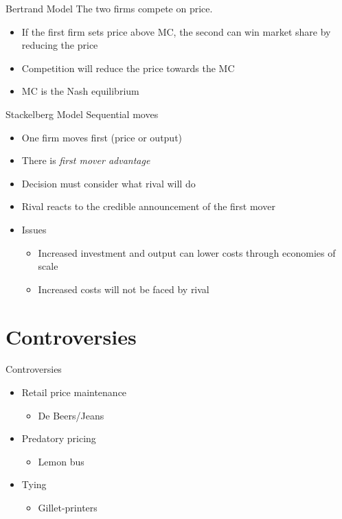 \documentclass[14pt,xcolor=pdftex,dvipsnames,table]{beamer}\usepackage[]{graphicx}\usepackage[]{color}
\begin{document}
\begin{frame}{Bertrand Model}
The two firms compete on price.  
\pause
\begin{itemize}[<+-| alert@+>]
\item If the first firm sets price above MC, the second can win market share by reducing the price
\item Competition will reduce the price towards the MC
\item MC is the Nash equilibrium
\end{itemize}
\end{frame}

\begin{frame}{Stackelberg Model}
Sequential moves  
\pause
\begin{itemize}[<+-| alert@+>]
\item One firm moves first (price or output)
\item There is \emph{first mover advantage}
\item Decision must consider what rival will do
\item Rival reacts to the credible announcement of the first mover
\item Issues
\begin{itemize}
\item Increased investment and output can lower costs through economies of scale
\item Increased costs will not be faced by rival
\end{itemize}
\end{itemize}
\end{frame}



\section{Controversies}
\begin{frame}{Controversies}
\begin{itemize}[<+-| alert@+>]
\item Retail price maintenance
\begin{itemize}
\item De Beers/Jeans 
\end{itemize}
\item Predatory pricing
\begin{itemize}
\item Lemon bus 
\end{itemize}
\item Tying
\begin{itemize}
\item Gillet-printers 
\end{itemize}

\end{itemize}
\end{frame}
\end{document}
